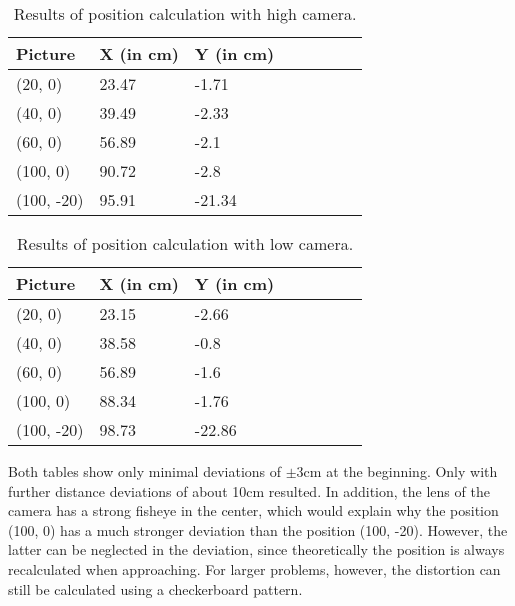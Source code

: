 \begin{table}[h]
  \caption{Results of position calculation with high camera.}
  \label{table:positionCalculationHigh}
  \renewcommand{\arraystretch}{1.2}
  \centering
  \sffamily
  \begin{footnotesize}
    \begin{tabularx}{0.58\linewidth}{l L L L L L L L}
      \toprule
      \textbf{Picture} & \textbf{X (in cm)} & \textbf{Y (in cm)} \\
      \midrule
        (20, 0)  & 23.47   & -1.71      \\
        (40, 0)  & 39.49   & -2.33      \\
        (60, 0)  & 56.89   & -2.1       \\
        (100, 0) & 90.72   & -2.8       \\
        (100, -20) & 95.91 & -21.34     \\
      \bottomrule
    \end{tabularx}
  \end{footnotesize}
  \rmfamily
\end{table}

\begin{table}[h]
  \caption{Results of position calculation with low camera.}
  \label{table:positionCalculationLow}
  \renewcommand{\arraystretch}{1.2}
  \centering
  \sffamily
  \begin{footnotesize}
    \begin{tabularx}{0.58\linewidth}{l L L L L L L L}
      \toprule
      \textbf{Picture} & \textbf{X (in cm)} & \textbf{Y (in cm)} \\
      \midrule
        (20, 0)    & 23.15  & -2.66        \\
        (40, 0)    & 38.58  & -0.8         \\
        (60, 0)    & 56.89  & -1.6         \\
        (100, 0)  & 88.34  & -1.76        \\
        (100, -20) & 98.73  & -22.86       \\
      \bottomrule
    \end{tabularx}
  \end{footnotesize}
  \rmfamily
\end{table}


Both tables show only minimal deviations of $\pm$3cm at the beginning. Only with further distance deviations of about 10cm resulted. In addition, the lens of the camera has a strong fisheye in the center, which would explain why the position (100, 0) has a much stronger deviation than the position (100, -20). However, the latter can be neglected in the deviation, since theoretically the position is always recalculated when approaching. For larger problems, however, the distortion can still be calculated using a checkerboard pattern.


